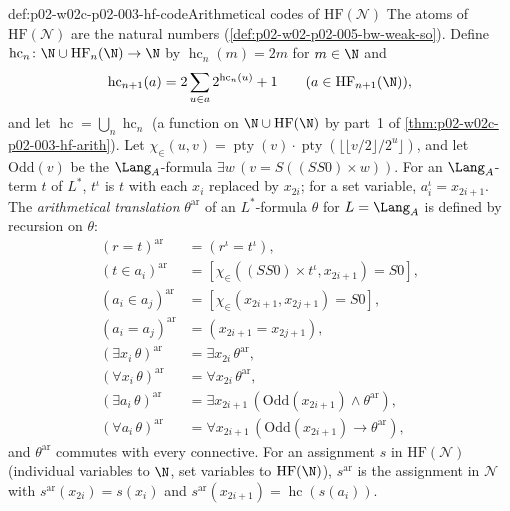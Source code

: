 \begin{hbdefinition}{def:p02-w02c-p02-003-hf-code}{Arithmetical codes of \(\mathrm{HF}(\mathcal N)\)}
The atoms of \(\mathrm{HF}(\mathcal N)\) are the natural numbers
(\cref{def:p02-w02-p02-005-bw-weak-so}).  Define
\(\operatorname{hc}_n\colon\N\cup\mathrm{HF}_n(\N)\to\N\) by
\(\operatorname{hc}_n(m)=2m\) for \(m\in\N\) and
\[
 \operatorname{hc}_{n+1}(a)=2\sum_{u\in a}2^{\operatorname{hc}_n(u)}+1
 \qquad(a\in\mathrm{HF}_{n+1}(\N)),
\]
and let \(\operatorname{hc}=\bigcup_n\operatorname{hc}_n\) (a function on
\(\N\cup\mathrm{HF}(\N)\) by part~1 of
\cref{thm:p02-w02c-p02-003-hf-arith}).  Let
\(\chi_{\in}(u,v)=\operatorname{pty}(v)\cdot
\operatorname{pty}(\lfloor\lfloor v/2\rfloor/2^{u}\rfloor)\), and let
\(\mathrm{Odd}(v)\) be the \(\Lang_A\)-formula
\(\exists w\,(v=S((SS0)\times w))\).  For an \(\Lang_A\)-term \(t\) of
\(L^{*}\), \(t^{\iota}\) is \(t\) with each \(x_i\) replaced by
\(x_{2i}\); for a set variable, \(a_i^{\iota}=x_{2i+1}\).  The
\emph{arithmetical translation} \(\theta^{\mathrm{ar}}\) of an
\(L^{*}\)-formula \(\theta\) for \(L=\Lang_A\) is defined by recursion on
\(\theta\):
\begin{align*}
 (r=t)^{\mathrm{ar}}&=(r^{\iota}=t^{\iota}),\\
 (t\in a_i)^{\mathrm{ar}}&=[\chi_{\in}((SS0)\times t^{\iota},x_{2i+1})=S0],\\
 (a_i\in a_j)^{\mathrm{ar}}&=[\chi_{\in}(x_{2i+1},x_{2j+1})=S0],\\
 (a_i=a_j)^{\mathrm{ar}}&=(x_{2i+1}=x_{2j+1}),\\
 (\exists x_i\,\theta)^{\mathrm{ar}}&=\exists x_{2i}\,\theta^{\mathrm{ar}},\\
 (\forall x_i\,\theta)^{\mathrm{ar}}&=\forall x_{2i}\,\theta^{\mathrm{ar}},\\
 (\exists a_i\,\theta)^{\mathrm{ar}}&=\exists x_{2i+1}\,(\mathrm{Odd}(x_{2i+1})\land\theta^{\mathrm{ar}}),\\
 (\forall a_i\,\theta)^{\mathrm{ar}}&=\forall x_{2i+1}\,(\mathrm{Odd}(x_{2i+1})\to\theta^{\mathrm{ar}}),
\end{align*}
and \(\theta^{\mathrm{ar}}\) commutes with every connective.  For an
assignment \(s\) in \(\mathrm{HF}(\mathcal N)\) (individual variables to
\(\N\), set variables to \(\mathrm{HF}(\N)\)), \(s^{\mathrm{ar}}\) is the
assignment in \(\mathcal N\) with \(s^{\mathrm{ar}}(x_{2i})=s(x_i)\) and
\(s^{\mathrm{ar}}(x_{2i+1})=\operatorname{hc}(s(a_i))\).
\end{hbdefinition}

